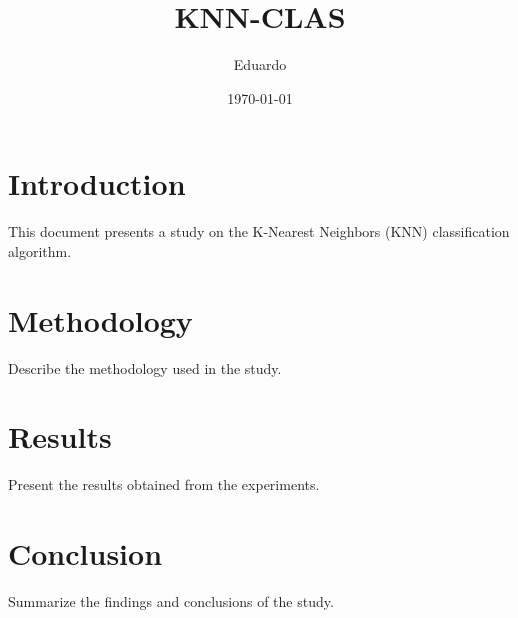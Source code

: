 \documentclass[a4paper]{article}
\title{KNN-CLAS}
\author{Eduardo}
\date{\today}
\begin{document}
\maketitle

\section{Introduction}
This document presents a study on the K-Nearest Neighbors (KNN) classification algorithm.

\section{Methodology}
Describe the methodology used in the study.

\section{Results}
Present the results obtained from the experiments.



\section{Conclusion}
Summarize the findings and conclusions of the study.
\end{document}
